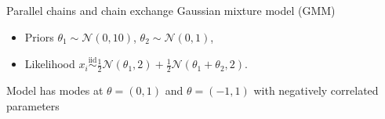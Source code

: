 \documentclass[final]{beamer}
\newlength{\onecolwid}
\newlength{\twocolwid}
\begin{document}
\begin{frame}[t]
\begin{columns}[t]
\begin{column}{\twocolwid}
\begin{columns}[t,totalwidth=\twocolwid] %

\begin{column}{\onecolwid}\vspace{-.6in} %


\begin{block}{Parallel chains and chain exchange}
  Gaussian mixture model (GMM)
  \begin{itemize}
    \item
      Priors $\theta_1 \sim \mathcal{N}(0,10)$, $\theta_2 \sim \mathcal{N}(0,1)$,
    \item
      Likelihood
      $x_i \overset{\text{iid}}{\sim} \frac{1}{2}\mathcal{N}(\theta_1, 2) + \frac{1}{2}\mathcal{N}(\theta_1 + \theta_2, 2)$.
  \end{itemize}
  Model has modes at $\theta = (0,1)$ and
  $\theta = (-1,1)$ with negatively correlated parameters


\end{block}
\end{column}
\end{columns}
\end{column}
\end{columns}
\end{frame}
\end{document}
